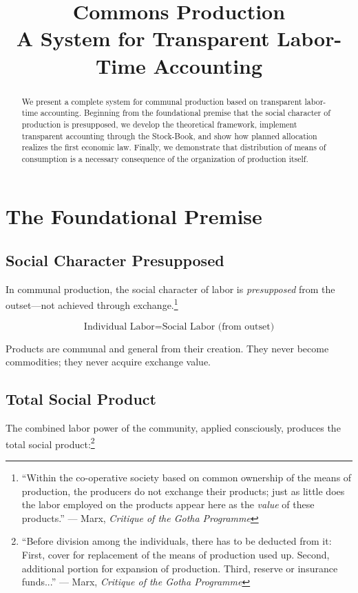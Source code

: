 \documentclass[12pt,a4paper]{article}
\title{\textbf{Commons Production}\\
\large A System for Transparent Labor-Time Accounting}
\author{}
\date{}
\begin{document}
\maketitle

\begin{abstract}
We present a complete system for communal production based on transparent labor-time accounting. Beginning from the foundational premise that the social character of production is presupposed, we develop the theoretical framework, implement transparent accounting through the Stock-Book, and show how planned allocation realizes the first economic law. Finally, we demonstrate that distribution of means of consumption is a necessary consequence of the organization of production itself.
\end{abstract}

\section{The Foundational Premise}

\subsection{Social Character Presupposed}

In communal production, the social character of labor is \textit{presupposed} from the outset—not achieved through exchange.\footnote{``Within the co-operative society based on common ownership of the means of production, the producers do not exchange their products; just as little does the labor employed on the products appear here as the \textit{value} of these products.'' --- Marx, \textit{Critique of the Gotha Programme}}

\begin{equation}
\text{Individual Labor} = \text{Social Labor (from outset)}
\end{equation}

Products are communal and general from their creation. They never become commodities; they never acquire exchange value.
\subsection{Total Social Product}

The combined labor power of the community, applied consciously, produces the total social product:\footnote{``Before division among the individuals, there has to be deducted from it: First, cover for replacement of the means of production used up. Second, additional portion for expansion of production. Third, reserve or insurance funds...'' --- Marx, \textit{Critique of the Gotha Programme}}
\end{document}
